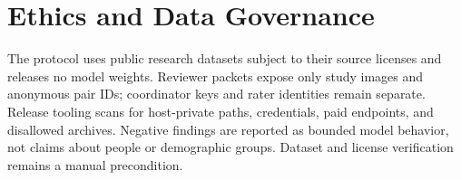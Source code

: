 \section{Ethics and Data Governance}
The protocol uses public research datasets subject to their source licenses and releases no model
weights. Reviewer packets expose only study images and anonymous pair IDs; coordinator keys and rater
identities remain separate. Release tooling scans for host-private paths, credentials, paid endpoints,
and disallowed archives. Negative findings are reported as bounded model behavior, not claims about
people or demographic groups. Dataset and license verification remains a manual precondition.
